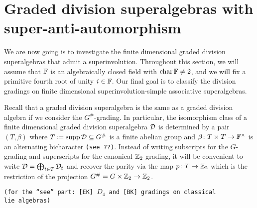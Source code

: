 
\section{Graded division superalgebras with super-anti-automorphism}

We are now going is to investigate the finite dimensional graded division superalgebras that admit a superinvolution. 
Throughout this section, we will assume that $\mathbb{F}$ is an algebraically closed field with $\operatorname{char} \mathbb{F} \neq 2$, and we will fix a primitive fourth root of unity $i \in \mathbb{F}$.
Our final goal is to classify the division gradings on finite dimensional superinvolution-simple associative superalgebras.
 
Recall that a graded division superalgebra is the same as a graded division algebra if we consider the $G^\#$-grading. 
In particular, the isomorphism class of a finite dimensional graded division superalgebra $\mathcal{D}$ is determined by a pair $(T, \beta)$ where $T \coloneqq \operatorname{supp} \mathcal{D} \subseteq G^\#$ is a finite abelian group and $\beta\colon T\times T \to \mathbb{F}^\times$ is an alternating bicharacter {\tt (see ??)}. 
Instead of writing subscripts for the $G$-grading and superscripts for the canonical $\mathbb{Z}_2$-grading, it will be convenient to write $\mathcal{D} = \bigoplus_{t\in T} \mathcal{D}_t$ and recover the parity via the map $p\colon T \to \mathbb{Z}_2$ which is the restriction of the projection $G^\# = G\times \mathbb{Z}_2 \to \mathbb{Z}_2$. 

{\tt (for the ``see'' part: [EK] $D_4$ and [BK] gradings on classical \\lie algebras)}

